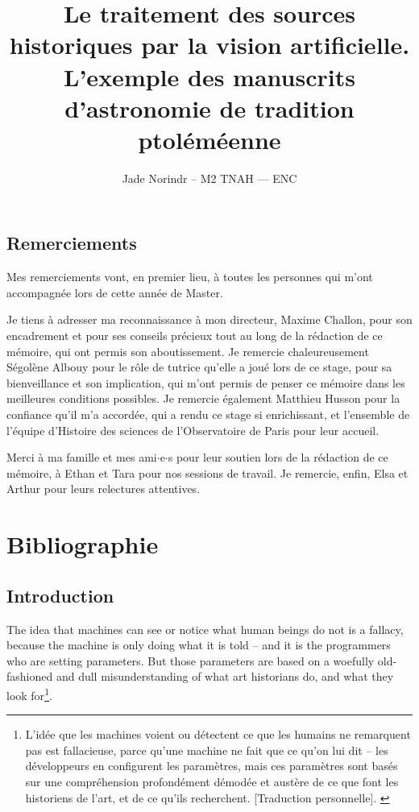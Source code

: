 \documentclass[a4paper,12pt,twoside]{book}
\author{Jade Norindr – M2 TNAH — ENC}
\title{Le traitement des sources historiques par la vision artificielle. L'exemple des manuscrits d'astronomie de tradition ptoléméenne}
\newcommand{\clearemptydoublepage}{\newpage{\pagestyle{empty}\cleardoublepage}}
\newcommand\chapterNo[1]{
  \chapter*{#1}
  \markright{\MakeUppercase{#1}}
}
\begin{document}
\onehalfspacing
\frontmatter

    

    \thispagestyle{empty}	
    \cleardoublepage
	
    
	
    \chapterNo{Remerciements}
    
    Mes remerciements vont, en premier lieu, à toutes les personnes qui m'ont accompagnée lors de cette année de Master.
    
    Je tiens à adresser ma reconnaissance à mon directeur, Maxime Challon, pour son encadrement et pour ses conseils précieux tout au long de la rédaction de ce mémoire, qui ont permis son aboutissement. Je remercie chaleureusement Ségolène Albouy pour le rôle de tutrice qu'elle a joué lors de ce stage, pour sa bienveillance et son implication, qui m'ont permis de penser ce mémoire dans les meilleures conditions possibles. Je remercie également Matthieu Husson pour la confiance qu'il m'a accordée, qui a rendu ce stage si enrichissant, et l'ensemble de l'équipe d'Histoire des sciences de l'Observatoire de Paris pour leur accueil.
    
    Merci à ma famille et mes ami$\cdot$e$\cdot$s pour leur soutien lors de la rédaction de ce mémoire, à Ethan et Tara pour nos sessions de travail. Je remercie, enfin, Elsa et Arthur pour leurs relectures attentives.
	
	\part*{Bibliographie}
    \printbibliography[keyword={DH},title={Humanités numériques}]
    \clearemptydoublepage
    \printbibliography[keyword={ml},title={\textit{Machine learning}, \textit{deep learning} et vision artificielle}]
    \clearemptydoublepage
    \printbibliography[keyword={technique},title={Documentation technique et méthode}]
    \clearemptydoublepage
    \printbibliography[keyword={astronomie},title={Histoire de l'astronomie}]
    \clearemptydoublepage
    
    \chapterNo{Introduction}
    \begin{displayquote}
    	The idea that machines can see or notice what human beings do not is a fallacy, because the machine is only doing what it is told – and it is the programmers who are setting parameters. But those parameters are based on a woefully old-fashioned and dull misunderstanding of what art historians do, and what they look for\footnote{\og L'idée que les machines voient ou détectent ce que les humains ne remarquent pas est fallacieuse, parce qu'une machine ne fait que ce qu'on lui dit -- les développeurs en configurent les paramètres, mais ces paramètres sont basés sur une compréhension profondément démodée et austère de ce que font les historiens de l'art, et de ce qu'ils recherchent. [Traduction personnelle]\fg. \cite{pollockComputersCanFind2014}}.
    \end{displayquote}
	\medspace
\end{document}
